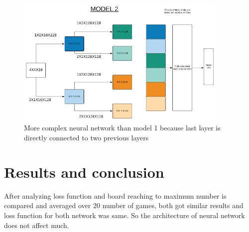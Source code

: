 \begin{figure}
 	[!htb]\centering
    \includegraphics[width=4in]{images/model2.png}
    \caption{More complex neural network than model 1 because last layer is directly connected to two previous layers}
  \label{fig:phase}
  \end{figure}
 
\section{Results and conclusion}
After analyzing loss function and board reaching to maximum number is compared and averaged over 20 number of games, both got similar results and loss function for both network was same. So the architecture of neural network does not affect much.
